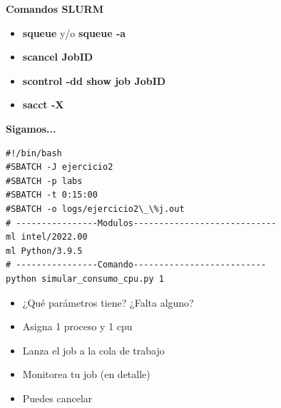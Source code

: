 \documentclass[aspectratio=169,professionalfonts]{beamer}
\begin{document}
\begin{frame}{\textbf{Comandos SLURM}}
    \begin{itemize}
        \item \textbf{squeue} y/o \textbf{squeue -a}
         \vspace{0.5em} 
        \item \textbf{scancel JobID}
         \vspace{0.5em} 
        \item \textbf{scontrol -dd show job JobID}
         \vspace{0.5em} 
        \item \textbf{sacct -X}
        
    \end{itemize}
\end{frame}


\begin{frame}[fragile]{\textbf{Sigamos...}}


\begin{verbatim}
#!/bin/bash 
#SBATCH -J ejercicio2 
#SBATCH -p labs 
#SBATCH -t 0:15:00 
#SBATCH -o logs/ejercicio2\_\%j.out 
# ----------------Modulos---------------------------- 
ml intel/2022.00
ml Python/3.9.5 
# ----------------Comando-------------------------- 
python simular_consumo_cpu.py 1
\end{verbatim}



\begin{itemize}
    \item ¿Qué parámetros tiene? ¿Falta alguno?
         \vspace{0.5em} 
    \item Asigna 1 proceso y 1 cpu
         \vspace{0.5em} 
    \item Lanza el job a la cola de trabajo
         \vspace{0.5em} 
    \item Monitorea tu job (en detalle)
         \vspace{0.5em} 
    \item Puedes cancelar 
\end{itemize}
    
\end{frame}
\end{document}

